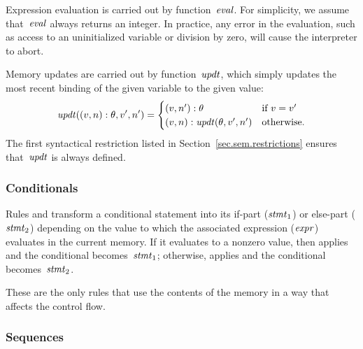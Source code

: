 Expression evaluation is carried out by function~$\mathop{\mathit{eval}}$.  For
simplicity, we assume that~$\mathop{\mathit{eval}}$ always returns an integer.  In
practice, any error in the evaluation, such as access to an uninitialized
variable or division by zero, will cause the interpreter to abort.

Memory updates are carried out by function~$\mathop{\mathit{updt}}$, which simply updates
the most recent binding of the given variable to the given value:
\[
  \mathop{\mathit{updt}}((v,n):\theta,v',n')=
  \begin{cases}
    (v,n'):\theta             &\text{if~$v=v'$}\\
    (v,n):\mathop{\mathit{updt}}(\theta,v',n') &\text{otherwise}.
  \end{cases}
\]
The first syntactical restriction listed in
Section~\ref{sec.sem.restrictions} ensures that~$\mathop{\mathit{updt}}$ is always defined.

\subsubsection*{Conditionals}


Rules  and  transform a conditional statement into
its if-part ($\mathit{stmt}_1$) or else-part ($\mathit{stmt}_2$) depending on the value to
which the associated expression ($\mathit{expr}$) evaluates in the current memory.
If it evaluates to a nonzero value, then  applies and the
conditional becomes~$\mathit{stmt}_1$; otherwise,  applies and the
conditional becomes~$\mathit{stmt}_2$.

These are the only rules that use the contents of the memory in a way that
affects the control flow.

\subsubsection*{Sequences}


